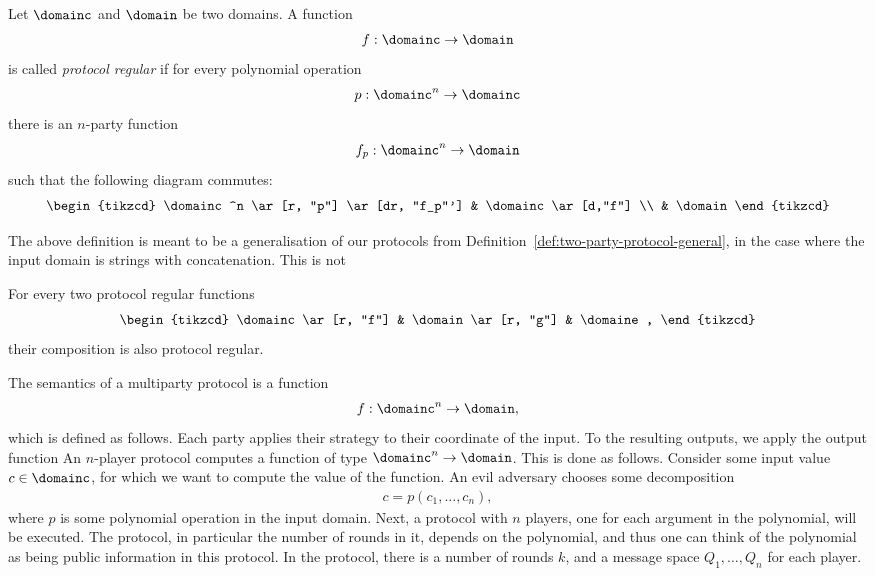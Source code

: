 \begin{definition}
    Let $\domainc$ and $\domain$ be two domains. A function 
    \begin{align*}
    f : \domainc \to \domain
    \end{align*} 
    is called \emph{protocol regular} if for every polynomial operation 
    \begin{align*}
    p : \domainc^n \to \domainc
    \end{align*}
    there is an $n$-party function 
    \begin{align*}
    f_p : \domainc^n \to \domain
    \end{align*}
    such that the following diagram commutes:
\[\begin{tikzcd}
\domainc^n \ar[r, "p"]  \ar[dr, "f_p"']
& \domainc \ar[d,"f"]  \\
& \domain 
\end{tikzcd}\]
\end{definition}

The above definition is meant to be a generalisation of our protocols from Definition~\ref{def:two-party-protocol-general}, in the case where the input domain is strings with concatenation. This is not 

\begin{theorem}
    For every two protocol regular functions 
    \[
    \begin{tikzcd}
    \domainc \ar[r, "f"] & \domain \ar[r, "g"] & \domaine,
    \end{tikzcd}
    \]
    their composition is also protocol regular.
\end{theorem}
The semantics of a multiparty protocol is a function 
\begin{align*}
f : \domainc^n \to \domain,
\end{align*} 
which is defined as follows. Each party applies their strategy to their coordinate of the input. To the resulting outputs, we apply the output function 
An $n$-player protocol computes a function of type $\domainc^n \to \domain$. 
This is done as follows. Consider some input value $c \in \domainc$, for which we want to compute the value of the function. An evil adversary chooses some decomposition 
\begin{align*}
c = p(c_1,\ldots,c_n),
\end{align*}
where $p$ is some polynomial operation in the input domain. Next, a protocol with $n$ players, one for each argument in the polynomial, will be executed. The protocol, in particular the number of rounds in it, depends on the polynomial, and thus one can think of the polynomial as being public information in this protocol. In the protocol, there is a number of rounds $k$, and a message space $Q_1,\ldots,Q_n$ for each player. 

